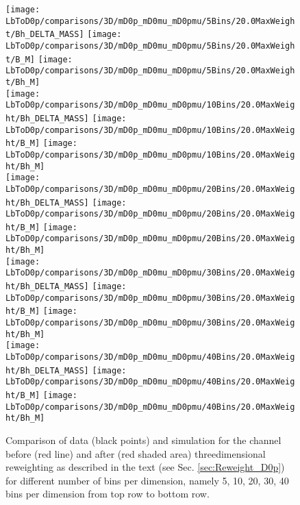\begin{figure}[tbp]
	\centering
	\texttt{[image: LbToD0p/comparisons/3D/mD0p\_mD0mu\_mD0pmu/5Bins/20.0MaxWeight/Bh\_DELTA\_MASS]}
	\texttt{[image: LbToD0p/comparisons/3D/mD0p\_mD0mu\_mD0pmu/5Bins/20.0MaxWeight/B\_M]}
	\texttt{[image: LbToD0p/comparisons/3D/mD0p\_mD0mu\_mD0pmu/5Bins/20.0MaxWeight/Bh\_M]} \\
	\texttt{[image: LbToD0p/comparisons/3D/mD0p\_mD0mu\_mD0pmu/10Bins/20.0MaxWeight/Bh\_DELTA\_MASS]}
	\texttt{[image: LbToD0p/comparisons/3D/mD0p\_mD0mu\_mD0pmu/10Bins/20.0MaxWeight/B\_M]}
	\texttt{[image: LbToD0p/comparisons/3D/mD0p\_mD0mu\_mD0pmu/10Bins/20.0MaxWeight/Bh\_M]} \\
	\texttt{[image: LbToD0p/comparisons/3D/mD0p\_mD0mu\_mD0pmu/20Bins/20.0MaxWeight/Bh\_DELTA\_MASS]}
	\texttt{[image: LbToD0p/comparisons/3D/mD0p\_mD0mu\_mD0pmu/20Bins/20.0MaxWeight/B\_M]}
	\texttt{[image: LbToD0p/comparisons/3D/mD0p\_mD0mu\_mD0pmu/20Bins/20.0MaxWeight/Bh\_M]} \\
	\texttt{[image: LbToD0p/comparisons/3D/mD0p\_mD0mu\_mD0pmu/30Bins/20.0MaxWeight/Bh\_DELTA\_MASS]}
	\texttt{[image: LbToD0p/comparisons/3D/mD0p\_mD0mu\_mD0pmu/30Bins/20.0MaxWeight/B\_M]}
	\texttt{[image: LbToD0p/comparisons/3D/mD0p\_mD0mu\_mD0pmu/30Bins/20.0MaxWeight/Bh\_M]} \\
	\texttt{[image: LbToD0p/comparisons/3D/mD0p\_mD0mu\_mD0pmu/40Bins/20.0MaxWeight/Bh\_DELTA\_MASS]}
	\texttt{[image: LbToD0p/comparisons/3D/mD0p\_mD0mu\_mD0pmu/40Bins/20.0MaxWeight/B\_M]}
	\texttt{[image: LbToD0p/comparisons/3D/mD0p\_mD0mu\_mD0pmu/40Bins/20.0MaxWeight/Bh\_M]} 
	\caption{Comparison of data (black points) and simulation for the \LbToDpmunuX channel before (red line) and after (red shaded area) threedimensional reweighting as described in the text (see Sec. \ref{sec:Reweight_D0p}) for different number of bins per dimension, namely 5, 10, 20, 30, 40 bins per dimension from top row to bottom row.}
	\label{fig:reweighting_nbins}
\end{figure}

